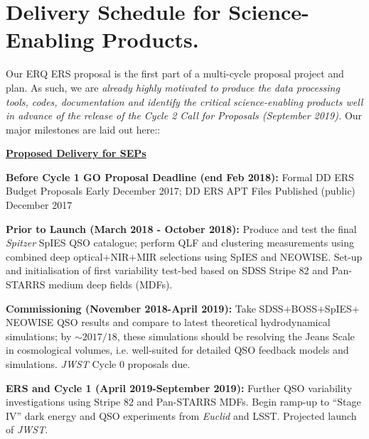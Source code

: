\section*{Delivery Schedule for Science-Enabling Products.} 
Our ERQ ERS proposal is the first part of a multi-cycle proposal
project and plan.  As such, we are {\it already highly motivated to
produce the data processing tools, codes, documentation and identify
the critical science-enabling products well in advance of the release
of the Cycle 2 Call for Proposals (September 2019).}
Our major milestones are laid out here::

\medskip
\medskip
\noindent 
{\bf \underline{Proposed Delivery for SEPs}} 

\smallskip
\smallskip
\noindent
{\bf Before Cycle 1 GO Proposal Deadline (end Feb 2018):} 
Formal DD ERS Budget Proposals	Early December 2017; 
DD ERS APT Files Published (public)	December 2017

\smallskip
\smallskip
\noindent
 {\bf Prior to Launch (March 2018 - October 2018):} 
Produce and test the final {\it Spitzer} SpIES QSO catalogue; perform
QLF and clustering measurements using combined deep
optical$+$NIR$+$MIR selections using SpIES and NEOWISE.  Set-up and
initialisation of first variability test-bed based on SDSS Stripe 82
and Pan-STARRS medium deep fields (MDFs).

\smallskip
\smallskip
\noindent
{\bf Commissioning (November 2018-April 2019):} 
Take SDSS$+$BOSS$+$SpIES$+$NEOWISE QSO results and compare to latest
theoretical hydrodynamical simulations; by $\sim2017/18$, these
simulations should be resolving the Jeans Scale in cosmological
volumes, i.e. well-suited for detailed QSO feedback models and
simulations. {\it JWST} Cycle 0 proposals due.

\smallskip
\smallskip
\noindent
{\bf ERS and Cycle 1 (April 2019-September 2019):} 
Further QSO variability investigations using Stripe 82 and Pan-STARRS
MDFs. Begin ramp-up to ``Stage IV'' dark energy and QSO experiments
from {\it Euclid} and LSST.  Projected launch of {\it JWST}.

